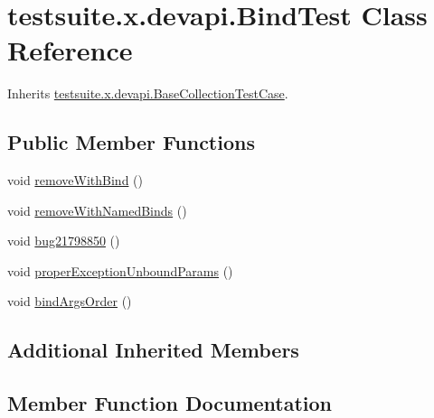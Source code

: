 \hypertarget{classtestsuite_1_1x_1_1devapi_1_1_bind_test}{}\section{testsuite.\+x.\+devapi.\+Bind\+Test Class Reference}
\label{classtestsuite_1_1x_1_1devapi_1_1_bind_test}


Inherits \mbox{\hyperlink{classtestsuite_1_1x_1_1devapi_1_1_base_collection_test_case}{testsuite.\+x.\+devapi.\+Base\+Collection\+Test\+Case}}.

\subsection*{Public Member Functions}
\begin{DoxyCompactItemize}
\item 
void \mbox{\hyperlink{classtestsuite_1_1x_1_1devapi_1_1_bind_test_ae66a5ff36d074edf10b1a4bf41f71d59}{remove\+With\+Bind}} ()
\item 
void \mbox{\hyperlink{classtestsuite_1_1x_1_1devapi_1_1_bind_test_a4642a4e47c40c09a56e2cc9b1ae00189}{remove\+With\+Named\+Binds}} ()
\item 
void \mbox{\hyperlink{classtestsuite_1_1x_1_1devapi_1_1_bind_test_a61c9cec580b1ca88b38556970df0c8b1}{bug21798850}} ()
\item 
void \mbox{\hyperlink{classtestsuite_1_1x_1_1devapi_1_1_bind_test_a67e7aa077458605d8dcb890e29822185}{proper\+Exception\+Unbound\+Params}} ()
\item 
void \mbox{\hyperlink{classtestsuite_1_1x_1_1devapi_1_1_bind_test_ad1e6bca8857a475a156a49ae62617160}{bind\+Args\+Order}} ()
\end{DoxyCompactItemize}
\subsection*{Additional Inherited Members}


\subsection{Member Function Documentation}
\mbox{\label{classtestsuite_1_1x_1_1devapi_1_1_bind_test_ad1e6bca8857a475a156a49ae62617160}} 
